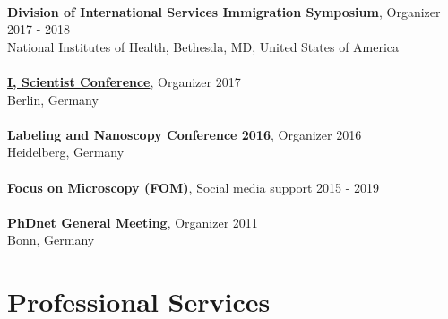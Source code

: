\documentclass[margin,line]{res}
\begin{document}
\begin{resume}
\vspace*{-3mm}\\
{\bf Division of International Services Immigration Symposium}, Organizer  \hfill {2017 - 2018}\\
National Institutes of Health, Bethesda, MD, United States of America\\
\vspace*{-3mm}\\
{\bf \href{https://www.iscientist.berlin/}{I, Scientist Conference}},  Organizer \hfill {2017}\\
Berlin, Germany\\
\vspace*{-3mm}\\
{\bf Labeling and Nanoscopy Conference 2016}, Organizer \hfill {2016}\\
Heidelberg, Germany\\
\vspace*{-3mm}\\
{\bf Focus on Microscopy (FOM)}, Social media support \hfill {2015 - 2019}\\
\vspace*{-3mm}\\
{\bf PhDnet General Meeting}, Organizer \hfill {2011}\\
Bonn, Germany


\section{\sc Professional Services}


\end{resume}
\end{document}
